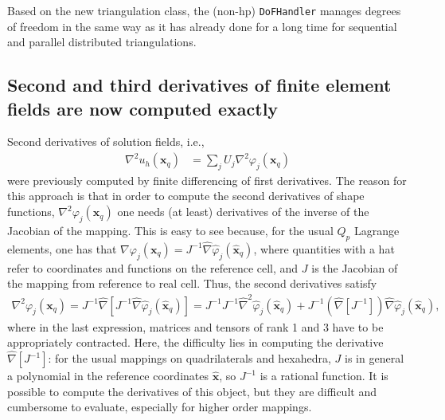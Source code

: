 \documentclass{ansarticle-preprint}
\begin{document}
Based on the new triangulation class, the (non-hp) \texttt{DoFHandler} manages
degrees of freedom in the same way as it has already done for a long time for
sequential and parallel distributed triangulations.


\subsection{Second and third derivatives of finite element fields are now
  computed exactly}

Second derivatives of solution fields, i.e.,
\begin{align*}
  \nabla^2 u_h(\mathbf x_q) &= \sum_{j} U_j \nabla^2\varphi_j(\mathbf x_q)
\end{align*}
were previously computed by finite differencing of first
derivatives. The reason for this approach is that in order to compute
the second derivatives of shape functions, $\nabla^2\varphi_j(\mathbf
x_q)$ one needs (at least) derivatives of the inverse of the Jacobian of the
mapping. This is easy to see because, for the usual $Q_p$ Lagrange
elements, one has that $\nabla\varphi_j(\mathbf
x_q)=J^{-1}\hat\nabla\hat\varphi_j(\hat{\mathbf x}_q)$, where quantities
with a hat refer to coordinates and functions on the reference cell,
and $J$ is the Jacobian of the mapping from reference to real
cell. Thus, the second derivatives satisfy
\begin{align*}
  \nabla^2\varphi_j(\mathbf x_q)
  =
  J^{-1}\hat\nabla\left[J^{-1}\hat\nabla\hat\varphi_j(\hat{\mathbf x}_q)\right]
  =
  J^{-1} J^{-1}\hat\nabla^2\hat\varphi_j(\hat{\mathbf x}_q)
  +
  J^{-1}\left(\hat\nabla [J^{-1}]\right)\hat\nabla\hat\varphi_j(\hat{\mathbf x}_q),
\end{align*}
where in the last expression, matrices and tensors of rank 1 and 3
have to be appropriately contracted.  Here, the difficulty lies in
computing the derivative $\hat\nabla [J^{-1}]$: for the usual mappings
on quadrilaterals and hexahedra, $J$ is in general a polynomial in the
reference coordinates $\hat {\mathbf x}$, so $J^{-1}$ is a rational
function. It is possible to compute the derivatives of this object,
but they are difficult and cumbersome to evaluate, especially for
higher order mappings.
\end{document}
